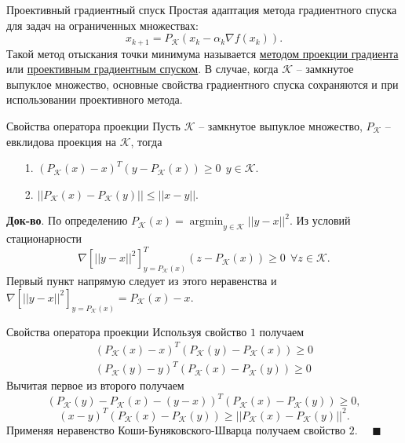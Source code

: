 \documentclass[10pt, handout]{beamer}
\DeclareMathOperator{\argmin}{argmin}
\begin{document}
\begin{frame}{Проективный градиентный спуск}
Простая адаптация метода градиентного спуска для задач на ограниченных множествах:
\begin{equation}\label{projected_gradient_descent}
x_{k+1}=P_\mathcal{K}(x_k-\alpha_k \nabla f(x_k)).
\end{equation}
\pause
Такой метод отыскания точки минимума называется \underline{методом проекции градиента} или \underline{проективным градиентным спуском}. В случае, когда
$\mathcal{K}$ -- замкнутое выпуклое множество, основные свойства градиентного спуска сохраняются и при использовании проективного метода.
\end{frame}

\begin{frame}{Свойства оператора проекции}
Пусть $\mathcal{K}$ -- замкнутое выпуклое множество, $P_\mathcal{K}$ -- евклидова проекция на $\mathcal{K}$, тогда
\pause
\begin{itemize}[<+->]
\item[1.] $(P_\mathcal{K}(x)-x)^T(y-P_\mathcal{K}(x))\geq 0~~y\in \mathcal{K}$.
\item[2.] $||P_\mathcal{K}(x)-P_\mathcal{K}(y)||\leq ||x-y||$.
\end{itemize}
\pause
\textbf{Док-во}. По определению $P_\mathcal{K}(x)=\argmin_{y\in\mathcal{K}}||y-x||^2$. Из условий стационарности
$$
\nabla [||y-x||^2]_{y=P_\mathcal{K}(x)}^T(z-P_{\mathcal{K}}(x))\geq 0~~ \forall z\in \mathcal{K}.
$$
Первый пункт напрямую следует из этого неравенства и $\nabla[||y-x||^2]_{y=P_\mathcal{K}(x)}=P_\mathcal{K}(x)-x$.\\
\end{frame}

\begin{frame}{Свойства оператора проекции}
Используя свойство $1$ получаем
\begin{align*}
(P_\mathcal{K}(x)-x)^T(P_\mathcal{K}(y)-P_\mathcal{K}(x))\geq 0 \\
(P_\mathcal{K}(y)-y)^T(P_\mathcal{K}(x)-P_\mathcal{K}(y))\geq 0
\end{align*}
\pause
Вычитая первое из второго получаем
$$
(P_\mathcal{K}(y)-P_\mathcal{K}(x)-(y-x))^T(P_\mathcal{K}(x)-P_\mathcal{K}(y))\geq 0,
$$
$$
(x-y)^T(P_\mathcal{K}(x)-P_\mathcal{K}(y))\geq ||P_\mathcal{K}(x)-P_\mathcal{K}(y)||^2.
$$
\pause
Применяя неравенство Коши-Буняковского-Шварца получаем свойство $2$. ~~$\blacksquare$

\end{frame}
\end{document}
